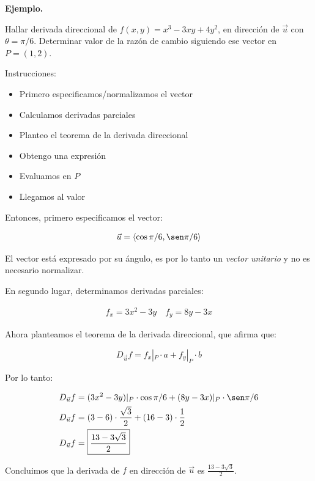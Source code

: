 \textbf{Ejemplo.}

Hallar derivada direccional de \(f(x,y) = x^{3} - 3xy + 4y^{2}\),
en dirección de \(\vec{u}\) con \(\theta = \pi/6\).
Determinar valor de la razón de cambio siguiendo ese vector en \(P = (1,2)\).

Instrucciones:
\begin{itemize}
    \item Primero especificamos/normalizamos el vector
    \item Calculamos derivadas parciales
    \item Planteo el teorema de la derivada direccional
    \item Obtengo una expresión
    \item Evaluamos en \(P\)
    \item Llegamos al valor
\end{itemize}

Entonces,
primero especificamos el vector:

\begin{align*}
    \vec{u} = \langle\cos\pi/6,\sen\pi/6 \rangle
\end{align*}

El vector está expresado por su ángulo,
es por lo tanto un \textit{vector unitario} y no es necesario normalizar.

En segundo lugar,
determinamos derivadas parciales:

\begin{align*}
    f_x = 3x^{2} - 3y \quad f_y = 8y - 3x
\end{align*}

Ahora planteamos el teorema de la derivada direccional,
que afirma que:

\begin{equation*}
    D_{\vec{u}}f = f_x|_P\cdot a + f_y|_P\cdot b
\end{equation*}

Por lo tanto:

\begin{align*}
    D_{\vec{u}}f & = (3x^{2} - 3y)|_P\cdot \cos\pi/6
    + (8y - 3x)|_P\cdot \sen\pi/6                     \\
    D_{\vec{u}}f & = (3 - 6) \cdot \frac{\sqrt{3}}{2}
    + (16 - 3) \cdot \frac{1}{2}                      \\
    D_{\vec{u}}f & = \boxed{\frac{13 - 3\sqrt{3}}{2}}
\end{align*}

Concluimos que la derivada de \(f\) en dirección de \(\vec{u}\) es
\(\frac{13 - 3\sqrt{3}}{2}\).

